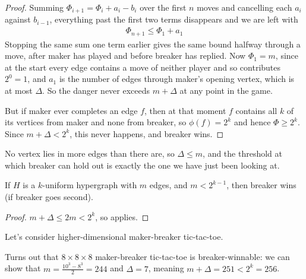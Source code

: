 \begin{proof}
    Summing $\Phi_{i + 1} = \Phi_i + a_i - b_i$ over the first $n$ moves and cancelling each $a_i$ against $b_{i - 1}$, everything past the first two terms disappears and we are left with
    \begin{align*}
        \Phi_{n + 1} \leq \Phi_1 + a_1
    \end{align*}
    Stopping the same sum one term earlier gives the same bound halfway through a move, after maker has played and before breaker has replied. Now $\Phi_1 = m$, since at the start every edge contains a move of neither player and so contributes $2^0 = 1$, and $a_1$ is the number of edges through maker's opening vertex, which is at most $\Delta$. So the danger never exceeds $m + \Delta$ at any point in the game.

    But if maker ever completes an edge $f$, then at that moment $f$ contains all $k$ of its vertices from maker and none from breaker, so $\phi(f) = 2^k$ and hence $\Phi \geq 2^k$. Since $m + \Delta < 2^k$, this never happens, and breaker wins.
\end{proof}

No vertex lies in more edges than there are, so $\Delta \leq m$, and the threshold at which breaker can hold out is exactly the one we have just been looking at.

\begin{boxcorollary}
    If $H$ is a $k$-uniform hypergraph with $m$ edges, and $m < 2^{k - 1}$, then breaker wins (if breaker goes second).
\end{boxcorollary}
\begin{proof}
    $m + \Delta \leq 2m < 2^k$, so  applies.
\end{proof}

Let's consider higher-dimensional maker-breaker tic-tac-toe.

\begin{boxexample}
    Turns out that $8 \times 8 \times 8$ maker-breaker tic-tac-toe is breaker-winnable: we can show that $m = \frac{10^3 - 8^3}{2} = 244$ and $\Delta = 7$, meaning $m + \Delta = 251 < 2^k = 256$.
\end{boxexample}

